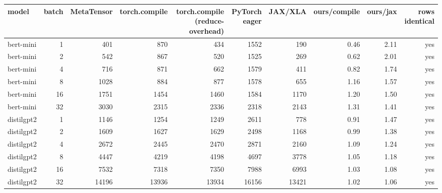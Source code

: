 \begin{tabular}{lrrrrrrrrr}
\toprule
model & batch & MetaTensor & torch.compile & torch.compile (reduce-overhead) & PyTorch eager & JAX/XLA & ours/compile & ours/jax & rows identical \\
\midrule
bert-mini & 1 & 401 & 870 & 434 & 1552 & 190 & 0.46 & 2.11 & yes \\
bert-mini & 2 & 542 & 867 & 520 & 1525 & 269 & 0.62 & 2.01 & yes \\
bert-mini & 4 & 716 & 871 & 662 & 1579 & 411 & 0.82 & 1.74 & yes \\
bert-mini & 8 & 1028 & 884 & 877 & 1578 & 655 & 1.16 & 1.57 & yes \\
bert-mini & 16 & 1751 & 1454 & 1460 & 1584 & 1170 & 1.20 & 1.50 & yes \\
bert-mini & 32 & 3030 & 2315 & 2336 & 2318 & 2143 & 1.31 & 1.41 & yes \\
distilgpt2 & 1 & 1146 & 1254 & 1249 & 2611 & 778 & 0.91 & 1.47 & yes \\
distilgpt2 & 2 & 1609 & 1627 & 1629 & 2498 & 1168 & 0.99 & 1.38 & yes \\
distilgpt2 & 4 & 2672 & 2445 & 2470 & 2871 & 2160 & 1.09 & 1.24 & yes \\
distilgpt2 & 8 & 4447 & 4219 & 4198 & 4697 & 3778 & 1.05 & 1.18 & yes \\
distilgpt2 & 16 & 7532 & 7318 & 7350 & 7988 & 6993 & 1.03 & 1.08 & yes \\
distilgpt2 & 32 & 14196 & 13936 & 13934 & 16156 & 13421 & 1.02 & 1.06 & yes \\
\bottomrule
\end{tabular}
